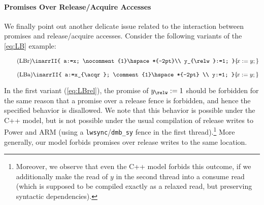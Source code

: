 \paragraph{Promises Over Release/Acquire Accesses}
We finally point out another delicate issue related to the interaction between
promises and release/acquire accesses.
Consider the following variants of the \ref{eq:LB} example:
\begin{center}
\hspace*{-2mm}
\begin{minipage}{.5\columnwidth}
\begin{equation}\label{eq:LBrel}\tag{LBr}
\inarrII{ a:=x; \nocomment{1}\hspace*{-2pt}\\ y_{\relw}:=1; }{\hspace*{-2pt} x:=y; }
\end{equation}
\end{minipage}
\hfill
\begin{minipage}{.5\columnwidth}
\begin{equation}\label{eq:LBacq}\tag{LBa}
\inarrII{ a:=x_{\acqr}; \comment{1}\hspace*{-2pt} \\ y:=1; }{\hspace*{-2pt} x:=y; }
\end{equation}
\end{minipage}
\end{center}
%
In the first variant (\ref{eq:LBrel}), the promise of $y_{\relw}:=1$ should be forbidden
for the same reason that a promise over a release fence is forbidden,
and hence the specified behavior is disallowed.
We note that this behavior is possible under the C++ model, 
but is not possible under the usual compilation of release writes
to Power and ARM (using a \texttt{lwsync}/\texttt{dmb\_sy} fence in the first thread).\footnote{%
Moreover, we observe that even the C++ model forbids this outcome, 
if we additionally make the read of $y$ in the second thread into a consume read 
(which is supposed to be compiled exactly as a relaxed read, but preserving syntactic dependencies).}
More generally, our model forbids promises over release writes to the same location.

